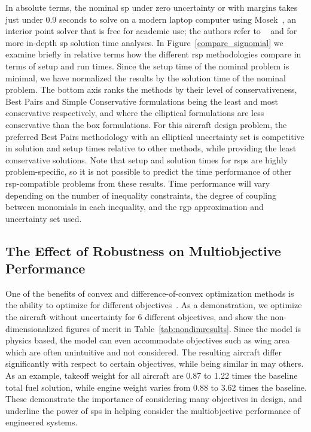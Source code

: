 In absolute
terms, the nominal \gls{sp} under zero uncertainty or with margins
takes just under 0.9 seconds to solve on a modern laptop computer using Mosek~\cite{mosek},
an interior point solver that is free for academic use; the authors
refer to ~\cite{Kirschen2018Log} and \cite{York2018} for more in-depth \gls{sp} solution time analyses.
In Figure~\ref{compare_signomial} we examine briefly in relative terms
how the different \gls{rsp} methodologies compare in terms of setup and
run times. Since the setup time of the nominal problem is minimal,
we have normalized the results by the solution time of the nominal problem.
The bottom axis ranks the methods by their level of conservativeness, Best Pairs
and Simple Conservative formulations being the least and most conservative respectively,
and where the elliptical formulations are less conservative than the box formulations.
For this aircraft design problem, the preferred Best Pairs methodology
with an elliptical uncertainty set
is competitive in solution and setup times relative to other methods, while providing
the least conservative solutions.
Note that setup and solution times for \gls{rsp}s are highly problem-specific, so it is not possible
to predict the time performance of other \gls{rsp}-compatible problems from these results.
Time performance will vary depending on the number of inequality constraints,
the degree of coupling between monomials
in each inequality, and the \gls{rgp} approximation and uncertainty set used.

\subsection{The Effect of Robustness on Multiobjective Performance}

One of the benefits of convex and difference-of-convex optimization methods is the ability to optimize for
different objectives~\cite{York2018}. As a demonstration, we optimize the aircraft without uncertainty
for 6 different objectives, and show
the non-dimensionalized figures of merit in Table~\ref{tab:nondimresults}.
Since the model is physics based, the model can even accommodate objectives such as wing area
which are often unintuitive and not considered. The resulting aircraft
differ significantly with respect to certain objectives, while being similar in may others.
As an example, takeoff weight for all aircraft are 0.87 to 1.22 times the baseline total fuel solution,
while engine weight varies from 0.88 to 3.62 times the baseline.
These demonstrate the importance of considering many objectives
in design, and underline the power of \gls{sp}s in helping
consider the multiobjective performance of engineered systems.


